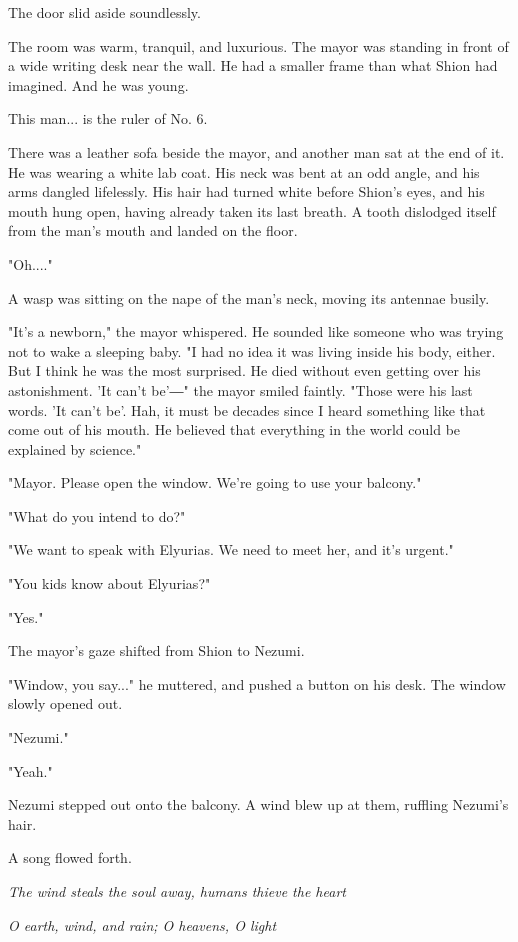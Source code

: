 The door slid aside soundlessly.

The room was warm, tranquil, and luxurious. The mayor was standing in
front of a wide writing desk near the wall. He had a smaller frame than
what Shion had imagined. And he was young.

This man... is the ruler of No. 6.

There was a leather sofa beside the mayor, and another man sat at the
end of it. He was wearing a white lab coat. His neck was bent at an odd
angle, and his arms dangled lifelessly. His hair had turned white before
Shion's eyes, and his mouth hung open, having already taken its last
breath. A tooth dislodged itself from the man's mouth and landed on the
floor.

"Oh...."

A wasp was sitting on the nape of the man's neck, moving its antennae
busily.

"It's a newborn," the mayor whispered. He sounded like someone who was
trying not to wake a sleeping baby. "I had no idea it was living inside
his body, either. But I think he was the most surprised. He died without
even getting over his astonishment. 'It can't be'―" the mayor smiled
faintly. "Those were his last words. 'It can't be'. Hah, it must be
decades since I heard something like that come out of his mouth. He
believed that everything in the world could be explained by science."

"Mayor. Please open the window. We're going to use your balcony."

"What do you intend to do?"

"We want to speak with Elyurias. We need to meet her, and it's urgent."

"You kids know about Elyurias?"

"Yes."

The mayor's gaze shifted from Shion to Nezumi.

"Window, you say..." he muttered, and pushed a button on his desk. The
window slowly opened out.

"Nezumi."

"Yeah."

Nezumi stepped out onto the balcony. A wind blew up at them, ruffling
Nezumi's hair.

A song flowed forth.

\emph{The wind steals the soul away, humans thieve the heart}

\emph{O earth, wind, and rain; O heavens, O light}

